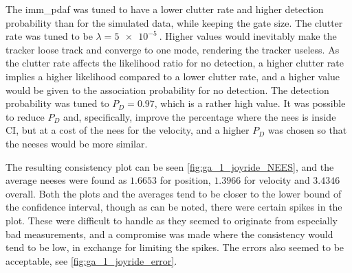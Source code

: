 The \acrshort{imm_pdaf} was tuned to have a lower clutter rate and higher detection probability than for the simulated data, while keeping the gate size. The clutter rate was tuned to be $\lambda = \SI{5e-5}{}$. Higher values would inevitably make the tracker loose track and converge to one mode, rendering the tracker useless. As the clutter rate affects the likelihood ratio for no detection, a higher clutter rate implies a higher likelihood compared to a lower clutter rate, and a higher value would be given to the association probability for no detection. The detection probability was tuned to $P_D = 0.97$, which is a rather high value. It was possible to reduce $P_D$ and, specifically, improve the percentage where the \acrshort{nees} is inside CI, but at a cost of the \acrshort{nees} for the velocity, and a higher $P_D$ was chosen so that the \acrshort{nees}es would be more similar. 

The resulting consistency plot can be seen \cref{fig:ga_1_joyride_NEES}, and the average \acrshort{nees}es were found as $1.6653$ for position, $1.3966$ for velocity and $3.4346$ overall. Both the plots and the averages tend to be closer to the lower bound of the confidence interval, though as can be noted, there were certain spikes in the plot. These were difficult to handle as they seemed to originate from especially bad measurements, and a compromise was made where the consistency would tend to be low, in exchange for limiting the spikes. The errors also seemed to be acceptable, see \cref{fig:ga_1_joyride_error}. 

